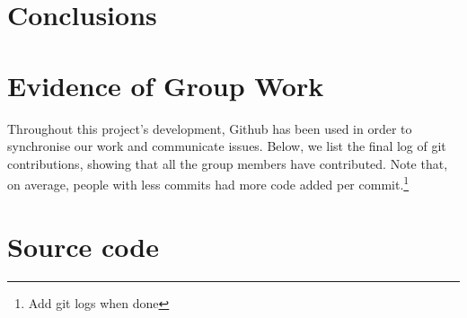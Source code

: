 \documentclass[11pt]{article}
\begin{document}
\section{Conclusions}

\newpage
{}



\newpage
\appendix

\section{Evidence of Group Work}
Throughout this project's development, Github has been used in order to synchronise our work and communicate issues. Below, we list the final log of git contributions, showing that all the group members have contributed. Note that, on average, people with less commits had more code added per commit.\footnote{Add git logs when done}
\section{Source code}
\end{document}
